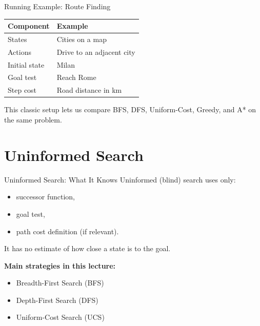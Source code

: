 \documentclass[10pt]{beamer}
\begin{document}
\begin{frame}{Running Example: Route Finding}
    \small
    \begin{tabular}{p{2.4cm}p{7.9cm}}
        \toprule
        \textbf{Component} & \textbf{Example} \\
        \midrule
        States & Cities on a map \\
        Actions & Drive to an adjacent city \\
        Initial state & Milan \\
        Goal test & Reach Rome \\
        Step cost & Road distance in km \\
        \bottomrule
    \end{tabular}
    \vspace{0.2cm}


    This classic setup lets us compare BFS, DFS, Uniform-Cost, Greedy, and A* on the same problem.
\end{frame}

\section{Uninformed Search}

\begin{frame}{Uninformed Search: What It Knows}
    Uninformed (blind) search uses only:
    \begin{itemize}
        \item successor function,
        \item goal test,
        \item path cost definition (if relevant).
    \end{itemize}
    \vspace{0.2cm}
    It has no estimate of how close a state is to the goal.

    \vspace{0.2cm}
    \textbf{Main strategies in this lecture:}
    \begin{itemize}
        \item Breadth-First Search (BFS)
        \item Depth-First Search (DFS)
        \item Uniform-Cost Search (UCS)
    \end{itemize}
\end{frame}
\end{document}
